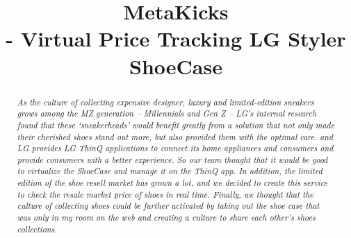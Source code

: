 \documentclass[conference]{IEEEtran}
\begin{document}
\title{MetaKicks\\
- Virtual Price Tracking LG Styler ShoeCase 
}

\author{
\and
{}
\and
{}
\and
{}
}

\maketitle

\begin{abstract}
\textit{As the culture of collecting expensive designer, luxury and limited-edition sneakers grows among the MZ generation – Millennials and Gen Z – LG’s internal research found that these ‘sneakerheads’ would benefit greatly from a solution that not only made their cherished shoes stand out more, but also provided them with the optimal care. and LG provides LG ThinQ applications to connect its home appliances and consumers and provide consumers with a better experience. So our team thought that it would be good to virtualize the ShoeCase and manage it on the ThinQ app. In addition, the limited edition of the shoe resell market has grown a lot, and we decided to create this service to check the resale market price of shoes in real time. Finally, we thought that the culture of collecting shoes could be further activated by taking out the shoe case that was only in my room on the web and creating a culture to share each other's shoes collections.}\end{abstract}
\end{document}
